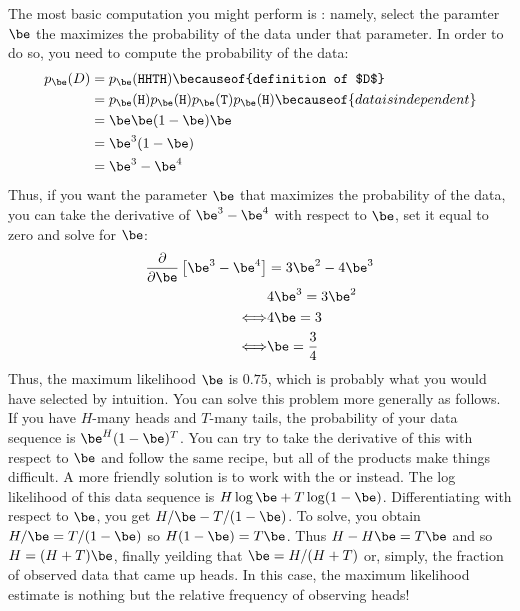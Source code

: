 
The most basic computation you might perform is : namely, select the paramter $\be$ the
maximizes the probability of the data under that parameter.  In order
to do so, you need to compute the probability of the data:
%
\begin{align} \label{eq:prob:binomial}
  p_\be(D)
  &= p_\be(\texttt{HHTH}) 
     \becauseof{definition of $D$} \\
  &= p_\be(\texttt{H})
     p_\be(\texttt{H})
     p_\be(\texttt{T})
     p_\be(\texttt{H})
      \becauseof{data is independent} \\
  &= \be \be (1-\be) \be \\
  &= \be^3 (1-\be) \\
  &= \be^3 - \be^4
\end{align}
%
Thus, if you want the parameter $\be$ that maximizes the probability
of the data, you can take the derivative of $\be^3-\be^4$ with respect
to $\be$, set it equal to zero and solve for $\be$:
%
\begin{align}
  \frac {\partial} {\partial \be} \left[ \be^3 - \be^4 \right] &= 3 \be^2 -  4\be^3\\
       & 4\be^3 = 3\be^2  \\
  \Longleftrightarrow & 4\be = 3 \\
  \Longleftrightarrow & \be  = \frac 3 4
\end{align}
%
Thus, the maximum likelihood $\be$ is $0.75$, which is probably what
you would have selected by intuition.
%
You can solve this problem more generally as follows.  If you have
$H$-many heads and $T$-many tails, the probability of your data
sequence is $\be^H (1-\be)^T$.  You can try to take the derivative of
this with respect to $\be$ and follow the same recipe, but all of the
products make things difficult.  A more friendly solution is to work
with the  or 
instead.  The log likelihood of this data sequence is $H \log \be + T
\log (1-\be)$.  Differentiating with respect to $\be$, you get $H/\be
- T/(1-\be)$.  To solve, you obtain $H/\be = T/(1-\be)$ so $H (1-\be)
= T \be$.  Thus $H - H\be = T\be$ and so $H = (H+T) \be$, finally
yeilding that $\be = H/(H+T)$ or, simply, the fraction of observed
data that came up heads.  In this case, the maximum likelihood
estimate is nothing but the relative frequency of observing heads!

